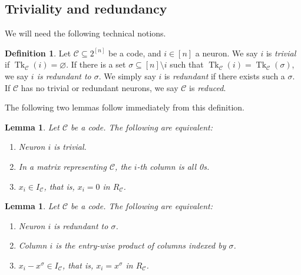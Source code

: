 \documentclass[11pt,letterpaper, reqno]{amsart}
\newtheorem{lem}[thm]{Lemma}         %
\theoremstyle{definition}
\newtheorem{defn}[thm]{Definition}   %
\DeclareMathOperator{\tk}{Tk}
\def\cC{\mathcal{C}}
\begin{document}
    \subsection{Triviality and redundancy}
        We will need the following technical notions.
                
        \begin{defn}
            Let $\cC \subseteq 2^{[n]}$ be a code, and $i \in [n]$ a neuron. We say $i$ is \emph{trivial} if $\tk_\cC(i) = \varnothing$. If there is a set $\sigma \subseteq[n]\setminus i$ such that $\tk_\cC(i) = \tk_\cC(\sigma)$, we say \emph{$i$ is redundant to $\sigma$}. We simply say $i$ is \emph{redundant} if there exists such a $\sigma$.
            If $\cC$ has no trivial or redundant neurons, we say $\cC$ is \emph{reduced}.
        \end{defn}
        The following two lemmas follow immediately from this definition.
        \begin{lem}
            Let $\cC$ be a code. The following are equivalent:
            \begin{enumerate}
                \item Neuron $i$ is trivial.
                \item In a matrix representing $\cC$, the $i$-th column is all 0s.
                \item $x_i \in I_\cC$, that is, $x_i = 0$ in $R_\cC$.
            \end{enumerate}
        \end{lem}
        \begin{lem}\label{lem:characterizeredundant}
            Let $\cC$ be a code. The following are equivalent:
            \begin{enumerate}
                \item Neuron $i$ is redundant to $\sigma$.
                \item Column $i$ is the entry-wise product of columns indexed by $\sigma$.
                \item $x_i - x^\sigma \in I_\cC$, that is, $x_i = x^\sigma$ in $R_\cC$.
            \end{enumerate}
        \end{lem}
\end{document}
